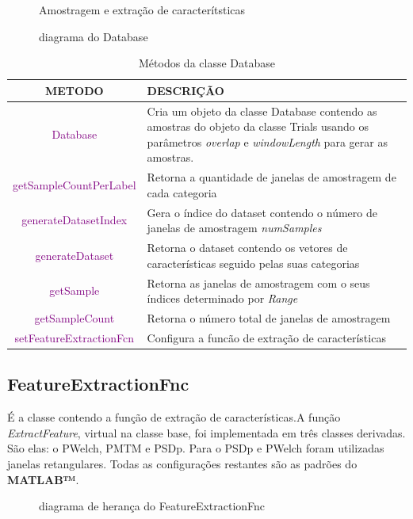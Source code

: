 \begin{figure}[h!]
	\caption{Amostragem e extra\c{c}\~ao de caracter\'itsticas}	
	\centering
	
	\label{fig:processoamostragem}
\end{figure}
\begin{figure}[h!]
	\caption{diagrama do Database}	
	\centering
	
	\label{fig:Database}
\end{figure}
\begin{table}[h!]
	\centering
	\caption{M\'etodos da classe Database}
	\begin{tabularx}{\textwidth}{c|X}		
		\hline\hline
		METODO & DESCRI\c{C}\~AO \\ \hline 
		\textcolor{purple}{Database} & Cria um objeto da classe Database contendo as amostras do objeto da classe Trials usando os par\^ametros \textit{overlap} e \textit{windowLength} para gerar as amostras. \\ \hline
		\textcolor{purple}{getSampleCountPerLabel} & Retorna a quantidade de janelas de amostragem de cada categoria\\ \hline
		\textcolor{purple}{generateDatasetIndex} &  Gera o \'indice do dataset contendo o n\'umero de janelas de amostragem \textit{numSamples}\\ \hline
		\textcolor{purple}{generateDataset} & Retorna o dataset contendo os vetores de caracter\'isticas seguido pelas suas categorias \\ \hline
		\textcolor{purple}{getSample} & Retorna as janelas de amostragem com o seus \'indices determinado por \textit{Range} \\ \hline
		\textcolor{purple}{getSampleCount} &  Retorna o n\'umero total de janelas de amostragem\\\hline
		\textcolor{purple}{setFeatureExtractionFcn} & Configura a func\~ao de extra\c{c}\~ao de caracter\'isticas \\ \hline
	\end{tabularx}
	\label{Tab:metodosdb}
\end{table}
\clearpage
\subsection{FeatureExtractionFnc}
\'E a classe contendo a fun\c{c}\~ao de extra\c{c}\~ao de caracter\'isticas.A fun\c{c}\~ao \textit{ExtractFeature}, virtual na classe base, foi implementada em tr\^es classes derivadas. S\~ao elas: o \acf{PWelch}, \acf{PMTM} e \ac{PSDp}. Para o \ac{PSDp} e \ac{PWelch} foram utilizadas janelas retangulares. Todas as configura\c{c}\~oes restantes s\~ao as padr\~oes do \textbf{MATLAB™}.
\begin{figure}[h!]
	\caption{diagrama de heran\c{c}a do FeatureExtractionFnc}	
	\centering
	
	\label{fig:FeatureExtraction}
\end{figure}

